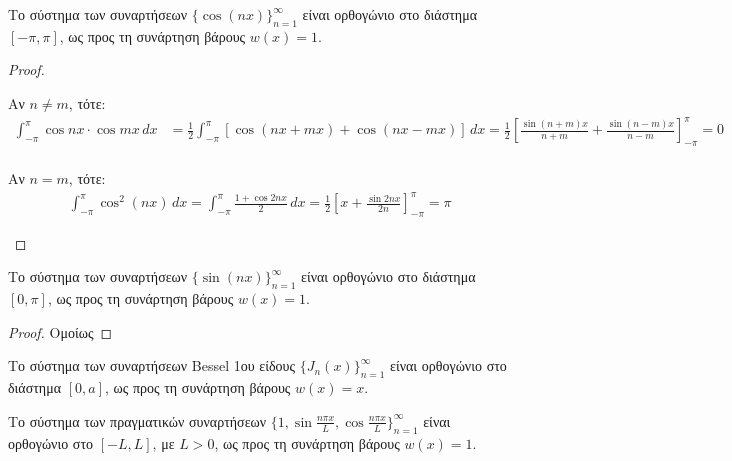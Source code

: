 \begin{prop}
    Το σύστημα των συναρτήσεων $ \{ \cos{(nx)} \}_{n=1}^{\infty} $ είναι ορθογώνιο 
    στο διάστημα $ [-\pi, \pi] $, ως προς τη συνάρτηση βάρους $ w(x)=1 $.

    \begin{proof}
    \item {}
        \begin{myitemize}
        \item Αν $ n \neq m $, τότε:
            \begin{align*}
                \int _{-\pi}^{\pi} \cos{nx} \cdot \cos{mx} \,{dx} &= \frac{1}{2} 
                \int _{-\pi}^{\pi} [\cos{(nx+mx)} + \cos{(nx - mx)}] \,{dx} = 
                \frac{1}{2} 
                \left[\frac{\sin{(n+m)x}}{n+m} + \frac{\sin{(n-m)x}}{n-m}
                \right]_{-\pi}^{\pi} = 0 \\
            \end{align*} 

        \item Αν $ n = m $, τότε:
            \begin{align*}
                \int _{-\pi}^{\pi} \cos^{2}(nx) \,{dx} = 
                \int _{-\pi}^{\pi} \frac{1+ \cos{2nx}}{2}
                \,{dx} = 
                \frac{1}{2} \left[x + \frac{\sin{2nx}}{2n}\right]_{-\pi}^{\pi} = \pi 
            \end{align*}
        \end{myitemize}
    \end{proof}
\end{prop}


\begin{prop}
    Το σύστημα των συναρτήσεων $ \{ \sin{(nx)} \} _{n=1}^{\infty} $ είναι ορθογώνιο
    στο διάστημα $ [0, \pi] $, ως προς τη συνάρτηση βάρους $ w(x)=1 $.
\end{prop}

\begin{proof}
\item {}
    Ομοίως
\end{proof}

\begin{prop}
    Το σύστημα των συναρτήσεων Bessel 1ου είδους $ \{ J_{n}(x) \} _{n=1}^{\infty} $ 
    είναι ορθογώνιο στο διάστημα $ [0,a] $, ως προς τη συνάρτηση βάρους $ w(x)=x $.
\end{prop}

\begin{prop}
    Το σύστημα των πραγματικών συναρτήσεων 
    $ \{ 1, \sin{\frac{n \pi x}{L}, \cos{\frac{n \pi x}{L} } } \}_{n=1}^{\infty} $ 
    είναι ορθογώνιο στο $ [-L,L] $, με $ L>0 $, ως προς τη συνάρτηση βάρους 
    $ w(x)=1 $.
\end{prop}

